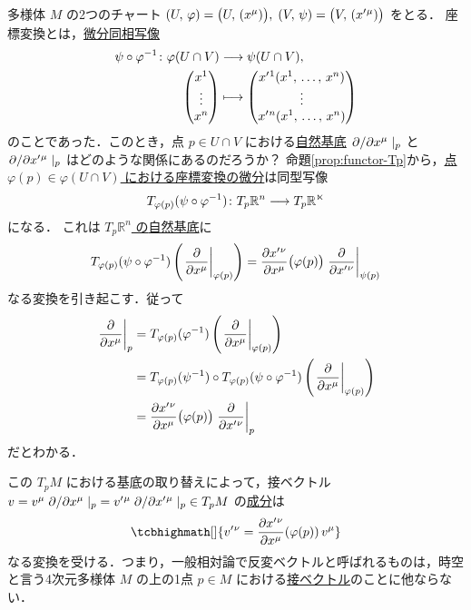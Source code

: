 \documentclass[geometry_main]{subfiles}
\begin{document}
\cinfty 多様体 $M$ の2つの\cinfty チャート $(U,\, \varphi) = \bigl(U,\, (x^\mu)\bigr),\; (V,\, \psi) = \bigl(V,\, (x'{}^\mu)\bigr)$ をとる．
座標変換とは，\hyperref[def.diff]{微分同相写像}
\begin{align}
	\psi \circ \varphi^{-1} \colon \varphi(U\cap V) &\lto \psi(U\cap V), \\
	\mqty(x^1 \\ \vdots \\ x^n) &\lmto \mqty(x'{}^1(x^1,\, \dots,\, x^n) \\ \vdots \\ x'{}^n (x^1,\, \dots ,\, x^n))
\end{align}
のことであった．このとき，点 $p \in U \cap V$ における\hyperref[naturalbasis]{自然基底} $\pdv*{}{x^\mu}|_p$ と $\pdv*{}{x'{}^\mu}|_p$ はどのような関係にあるのだろうか？
命題\ref{prop:functor-Tp}から，\hyperref[def:functor-Tp]{点 $\varphi(p) \in \varphi(U \cap V)$ における座標変換の微分}は同型写像
\begin{align}
	T_{\varphi(p)} (\psi \circ \varphi^{-1}) \colon T_p \mathbb{R}^n \longrightarrow T_p \mathbb{R^n}
\end{align}
になる．
これは \underline{$T_p \mathbb{R}^n$ の}\hyperref[naturalbasis]{自然基底}に
\begin{align}
	T_{\varphi(p)} (\psi \circ \varphi^{-1}) \left(\eval{\pdv{}{x^\mu}}_{\varphi(p)} \right) = \pdv{x'{}^\nu}{x^\mu} () \bigl(\varphi(p) \bigr) \eval{\pdv{}{x'{}^\nu}}_{\psi(p)}
\end{align}
なる変換を引き起こす．従って
\begin{align}
	\eval{\pdv{}{x^\mu}}_p &= T_{\varphi(p)} (\varphi^{-1}) \left( \eval{\pdv{}{x^\mu}}_{\varphi(p)} \right) \\
	&= T_{\varphi(p)} (\psi^{-1}) \circ T_{\varphi(p)} (\psi \circ \varphi^{-1}) \left(\eval{\pdv{}{x^\mu}}_{\varphi(p)} \right) \\ 
	&= \pdv{x'{}^\nu}{x^\mu} () \bigl(\varphi(p) \bigr) \eval{\pdv{}{x'{}^\nu}}_{p} \label{eq:trans-naturalbasis}
\end{align}
だとわかる．

この $T_p M$ における基底の取り替えによって，接ベクトル $v = v^\mu \pdv*{}{x^\mu}|_p = v'{}^\mu \pdv*{}{x'{}^\mu}|_p \in T_p M$ の\underline{成分}は
\begin{align}
	\label{eq:transform-vector}
	\tcbhighmath[]{v'{}^\nu = \pdv{x'{}^\nu}{x^\mu} ()(\varphi(p))\, v^\mu}
\end{align}
なる変換を受ける．つまり，一般相対論で反変ベクトルと呼ばれるものは，時空と言う4次元\cinfty 多様体 $M$ の上の1点 $p \in M$ における\hyperref[def.tangentv]{接ベクトル}のことに他ならない．
\end{document}
